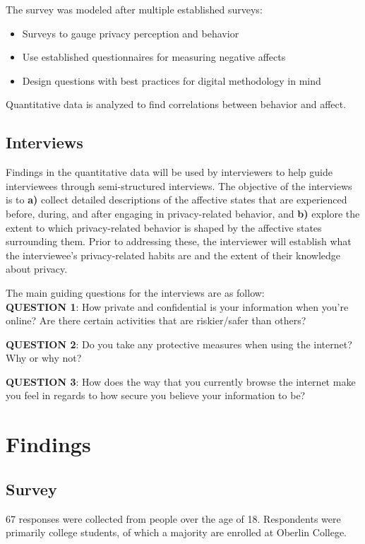 \documentclass[acmtog]{acmart}
\begin{document}
\noindent The survey was modeled after multiple established surveys:
\begin{itemize}
    \item Surveys to gauge privacy perception and behavior
    \item Use established questionnaires for measuring negative affects
	\cite{Rusch2007}
    \item Design questions with best practices for digital methodology in mind
	\cite{Hampton2017}
\end{itemize}

Quantitative data is analyzed to find correlations between behavior and affect.
\subsection{Interviews}
Findings in the quantitative data will be used by interviewers to help guide
interviewees through semi-structured interviews. The objective of the interviews
is to \textbf{a)} collect detailed descriptions of the affective states that are
experienced before, during, and after engaging in privacy-related behavior, and
\textbf{b)} explore the extent to which privacy-related behavior is shaped by
the affective states surrounding them. Prior to addressing these, the
interviewer will establish what the interviewee's privacy-related habits are and
the extent of their knowledge about privacy.

The main guiding questions for the interviews are as follow:\\

\textbf{QUESTION 1}: How private and confidential is your information when
you’re online? Are there certain activities that are riskier/safer than others?

\textbf{QUESTION 2}: Do you take any protective measures when using the
internet? Why or why not?

\textbf{QUESTION 3}: How does the way that you currently browse the internet
make you feel in regards to how secure you believe your information to be?

\section{Findings}
\subsection{Survey}
67 responses were collected from people over the age of 18. Respondents were
primarily  college students, of which a majority are enrolled at Oberlin
College.
\end{document}

